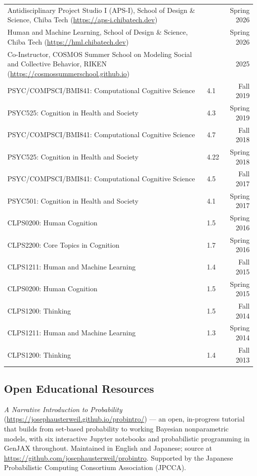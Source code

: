 \documentclass[a4paper,10pt]{article}
\begin{document}
\begin{tabu}{p{30em}<{\RaggedRight}Xr}
Antidisciplinary Project Studio I (APS-I), School of Design \& Science, Chiba Tech (\url{https://aps-i.chibatech.dev}) & & Spring 2026 \\

Human and Machine Learning, School of Design \& Science, Chiba Tech (\url{https://hml.chibatech.dev}) & & Spring 2026 \\

Co-Instructor, COSMOS Summer School on Modeling Social and Collective Behavior, RIKEN (\url{https://cosmossummerschool.github.io}) & & 2025 \\

PSYC/COMPSCI/BMI841: Computational Cognitive Science & 4.1 & Fall 2019 \\
PSYC525: Cognition in Health and Society & 4.3 & Spring 2019 \\

PSYC/COMPSCI/BMI841: Computational Cognitive Science & 4.7 & Fall 2018 \\

PSYC525: Cognition in Health and Society & 4.22 & Spring 2018 \\

PSYC/COMPSCI/BMI841: Computational Cognitive Science & 4.5 & Fall 2017 \\

PSYC501: Cognition in Health and Society & 4.1 & Spring 2017 \\

CLPS0200: Human Cognition & 1.5 & Spring 2016 \\

CLPS2200: Core Topics in Cognition & 1.7 & Spring 2016 \\

CLPS1211: Human and Machine Learning & 1.4 & Fall 2015 \\

CLPS0200: Human Cognition & 1.5 & Spring 2015 \\

CLPS1200: Thinking & 1.5 & Fall 2014 \\

CLPS1211: Human and Machine Learning & 1.3 & Spring 2014 \\

CLPS1200: Thinking & 1.4 & Fall 2013
\end{tabu}

\subsection{Open Educational Resources}
{\em A Narrative Introduction to Probability} (\url{https://josephausterweil.github.io/probintro/}) --- an open, in-progress tutorial that builds from set-based probability to working Bayesian nonparametric models, with six interactive Jupyter notebooks and probabilistic programming in GenJAX throughout. Maintained in English and Japanese; source at \url{https://github.com/josephausterweil/probintro}. Supported by the Japanese Probabilistic Computing Consortium Association (JPCCA).
\end{document}
